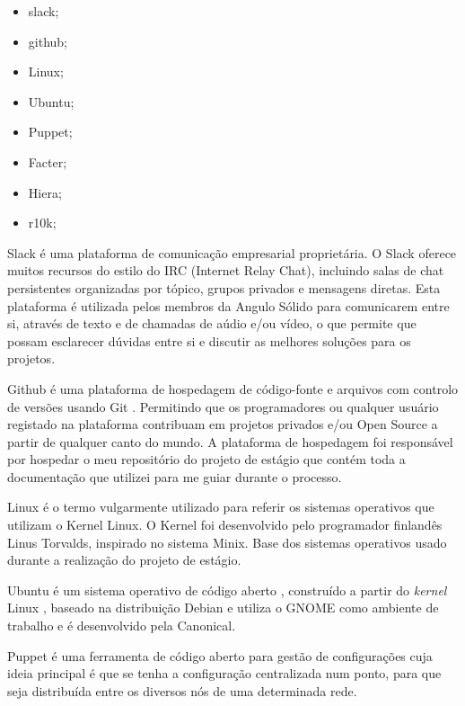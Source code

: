 \documentclass{article}
\begin{document}
\begin{itemize}
    \item slack;
	\item github;
	\item Linux;
	\item Ubuntu;
	\item Puppet;
	\item Facter;
	\item Hiera;
	\item r10k;
\end{itemize}

\cleardoublepage

Slack \cite{slack} é uma plataforma de comunicação empresarial proprietária. O Slack oferece muitos recursos do estilo do IRC (Internet Relay Chat), incluindo salas de chat persistentes organizadas por tópico, grupos privados e mensagens diretas.
Esta plataforma é utilizada pelos membros da Angulo Sólido para comunicarem entre si, através de texto e de chamadas de aúdio e/ou vídeo, o que permite que possam esclarecer dúvidas entre si e discutir as melhores soluções para os projetos.

Github \cite{github} é uma plataforma de hospedagem de código-fonte e arquivos com controlo de versões usando Git \cite{git}. Permitindo que os programadores ou qualquer usuário registado na plataforma contribuam em projetos privados e/ou Open Source \cite{opensource} a partir de qualquer canto do mundo.
A plataforma de hospedagem foi responsável por hospedar o meu repositório do projeto de estágio que contém toda a documentação que utilizei para me guiar durante o processo.

Linux \cite{linux} é o termo vulgarmente utilizado para referir os sistemas operativos que utilizam o Kernel Linux. O Kernel foi desenvolvido pelo programador finlandês Linus Torvalds, inspirado no sistema Minix.
Base dos sistemas operativos usado durante a realização do projeto de estágio.

Ubuntu \cite{ubuntu} é um sistema operativo de código aberto \cite{opensource}, construído a partir do \textit{kernel} Linux \cite{linux}, baseado na distribuição Debian e utiliza o GNOME como ambiente de trabalho e é desenvolvido pela Canonical.

Puppet \cite{puppet} é uma ferramenta de código aberto \cite{opensource} para gestão de configurações cuja ideia principal é que se tenha a configuração centralizada num ponto, para que seja distribuída entre os diversos nós de uma determinada rede.
\end{document}
